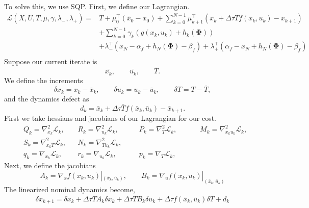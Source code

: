 \documentclass{article}
\begin{document}
To solve this, we use SQP. First, we define our Lagrangian. 
\begin{equation}
    \begin{aligned}
        \mathcal{L} (X, U , T, \mu, \gamma, \lambda_-, \lambda_+) = & T + \mu_0^\top (\bar x_0 - x_0) + \sum_{k=0}^{N - 1} \mu_{k+1}^\top \left(x_{k} + \Delta \tau T f(x_k, u_k) - x_{k+1}\right) \\
        & + \sum_{k=0}^{N-1} \gamma_k (g(x_k, u_k) + h_k(\mathbf{\Phi})) \\
        & + \lambda_-^\top (x_N - \alpha_f + h_N(\mathbf{\Phi}) - \beta_f) + \lambda_+^\top (\alpha_f - x_N + h_N(\mathbf{\Phi}) - \beta_f)\\ 
    \end{aligned}
\end{equation}
Suppose our current iterate is
\begin{equation}
    \bar{x_k}, \qquad \bar{u_k}, \qquad \bar{T}.
\end{equation}
We define the increments
\begin{equation}
    \delta x_k = x_k - \bar{x}_k, \qquad \delta u_k = u_k - \bar{u}_k, \qquad \delta T = T - \bar{T},
\end{equation}
and the dynamics defect as
\begin{equation}
    d_k =  \bar{x}_k + \Delta \tau \bar{T} f(\bar{x}_k, \bar{u}_k) - \bar{x}_{k+1}.
\end{equation}
First we take hessians and jacobians of our Lagrangian for our cost.
\begin{equation}
    \begin{aligned}
        & Q_k = \nabla^2_{x_k} \mathcal{L}_k, && R_k = \nabla^2_{u_k} \mathcal{L}_k, &&& P_k = \nabla^2_{T} \mathcal{L}_k, &&&& M_k = \nabla^2_{x_ku_k} \mathcal{L}_k, \\
        & S_k = \nabla^2_{x_kT} \mathcal{L}_k, && N_k = \nabla^2_{Tu_k} \mathcal{L}_k, \\
        & q_k = \nabla_{x_k} \mathcal{L}_k, && r_k = \nabla_{u_k} \mathcal{L}_k, &&& p_k = \nabla_{T} \mathcal{L}_k,
    \end{aligned}
\end{equation}
Next, we define the jacobians
\begin{equation}
    A_k = \nabla_x f(x_k, u_k) |_{(\bar{x}_k, \bar{u}_k)}, \qquad B_k = \nabla_u f(x_k, u_k) |_{(\bar{x}_k, \bar{u}_k)}
\end{equation}
The linearized nominal dynamics become,
\begin{equation}
    \delta x_{k+1} = \delta x_k + \Delta \tau \bar{T} A_k \delta x_k + \Delta \tau \bar{T} B_k \delta u_k + \Delta \tau f(\bar x_k, \bar u_k)\delta T + d_k
\end{equation}
\end{document}
